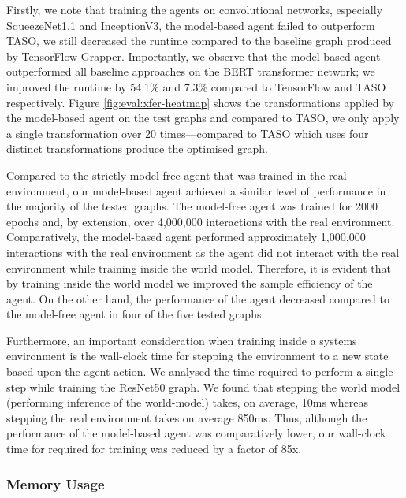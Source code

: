 Firstly, we note that training the agents on convolutional networks, especially SqueezeNet1.1 and InceptionV3, the model-based agent failed to outperform TASO, we still decreased the runtime compared to the baseline graph produced by TensorFlow Grapper. Importantly, we observe that the model-based agent outperformed all baseline approaches on the BERT transformer network; we improved the runtime by 54.1\% and 7.3\% compared to TensorFlow and TASO respectively. Figure \ref{fig:eval:xfer-heatmap} shows the transformations applied by the model-based agent on the test graphs and compared to TASO, we only apply a single transformation over 20 times---compared to TASO which uses four distinct transformations produce the optimised graph.


Compared to the strictly model-free agent that was trained in the real environment, our model-based agent achieved a similar level of performance in the majority of the tested graphs. The model-free agent was trained for 2000 epochs and, by extension, over 4,000,000 interactions with the real environment. Comparatively, the model-based agent performed approximately 1,000,000 interactions with the real environment as the agent did not interact with the real environment while training inside the world model. Therefore, it is evident that by training inside the world model we improved the sample efficiency of the agent. On the other hand, the performance of the agent decreased compared to the model-free agent in four of the five tested graphs.

Furthermore, an important consideration when training inside a systems environment is the wall-clock time for stepping the environment to a new state based upon the agent action. We analysed the time required to perform a single step while training the ResNet50 graph. We found that stepping the world model (performing inference of the world-model) takes, on average, 10ms whereas stepping the real environment takes on average 850ms. Thus, although the performance of the model-based agent was comparatively lower, our wall-clock time for required for training was reduced by a factor of 85x.

\subsubsection{Memory Usage}

